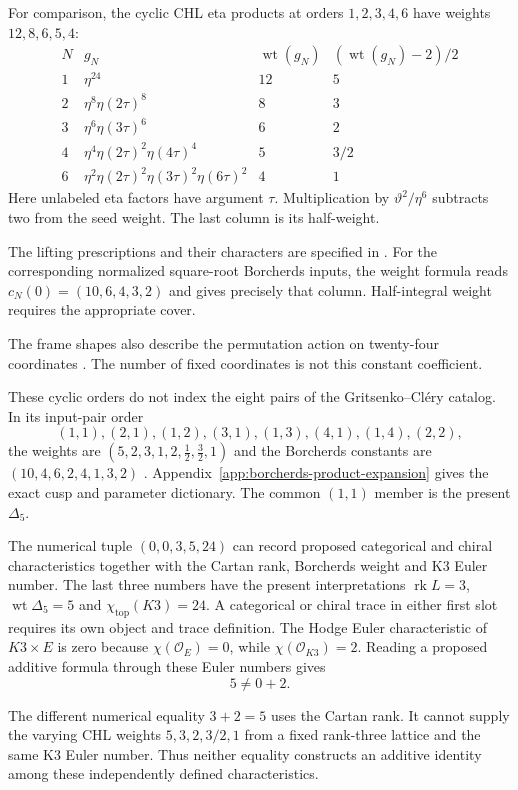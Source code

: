 For comparison, the cyclic CHL eta products at orders
$1,2,3,4,6$ have weights $12,8,6,5,4$:
\[
\begin{array}{c|l|c|c}
 N&g_N&\operatorname{wt}(g_N)&
       (\operatorname{wt}(g_N)-2)/2\\\hline
 1&\eta^{24}&12&5\\
 2&\eta^8\eta(2\tau)^8&8&3\\
 3&\eta^6\eta(3\tau)^6&6&2\\
 4&\eta^4\eta(2\tau)^2\eta(4\tau)^4&5&3/2\\
 6&\eta^2\eta(2\tau)^2\eta(3\tau)^2\eta(6\tau)^2&4&1
\end{array}
\]
Here unlabeled eta factors have argument $\tau$. Multiplication
by $\vartheta^2/\eta^6$ subtracts two from the seed weight. The last
column is its half-weight.

The lifting prescriptions and their
characters are specified in \cite{JS06Dyon,GK09CHL,GK10Composite}.
For the corresponding normalized square-root Borcherds inputs, the
weight formula reads $c_N(0)=(10,6,4,3,2)$ and gives precisely that
column. Half-integral weight requires the appropriate cover.

The frame shapes also describe the permutation action on twenty-four
coordinates \cite{ChengHarrison}. The number of fixed coordinates
is not this constant coefficient.

These cyclic orders do not index the eight pairs of the
Gritsenko--Cl\'ery catalog. In its input-pair order
\[
 (1,1),(2,1),(1,2),(3,1),(1,3),(4,1),(1,4),(2,2),
\]
the weights are $(5,2,3,1,2,\tfrac12,\tfrac32,1)$ and the
Borcherds constants are $(10,4,6,2,4,1,3,2)$
\cite[Theorem~1.4]{GC}. Appendix~\ref{app:borcherds-product-expansion}
gives the exact cusp and parameter dictionary. The common
$(1,1)$ member is the present $\Delta_5$.

\begin{remark}
\label{rem:bkm-additive-collapse-fails}
The numerical tuple $(0,0,3,5,24)$ can record proposed categorical
and chiral characteristics together with the Cartan rank, Borcherds
weight and K3 Euler number. The last three numbers have the present
interpretations
$\operatorname{rk}L=3$, $\operatorname{wt}\Delta_5=5$ and
$\chi_{\mathrm{top}}(K3)=24$. A categorical or chiral trace in
either first slot requires its own object and trace definition.
The Hodge Euler characteristic of $K3\times E$ is zero because
$\chi(\mathcal O_E)=0$, while $\chi(\mathcal O_{K3})=2$.
Reading a proposed additive formula through these Euler numbers gives
\[
 5\ne0+2.
\]

The different numerical equality $3+2=5$ uses the Cartan rank.
It cannot supply the varying CHL weights $5,3,2,3/2,1$ from a
fixed rank-three lattice and the same K3 Euler number.
Thus neither equality constructs an additive identity among these
independently defined characteristics.
\end{remark}

